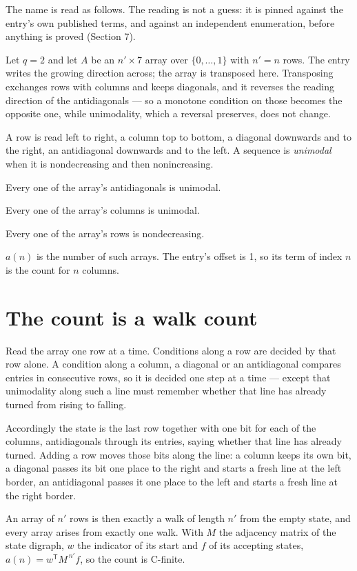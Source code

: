 \documentclass[11pt]{article}
\theoremstyle{definition}
\begin{document}
The name is read as follows. The reading is not a guess: it is pinned against the entry's own published terms, and against an independent enumeration, before anything is proved (Section 7).

Let $q = 2$ and let $A$ be an $n' \times 7$ array over $\{0,\dots,1\}$ with $n' = n$ rows. The entry writes the growing direction across; the array is transposed here. Transposing exchanges rows with columns and keeps diagonals, and it reverses the reading direction of the antidiagonals --- so a monotone condition on those becomes the opposite one, while unimodality, which a reversal preserves, does not change.

A row is read left to right, a column top to bottom, a diagonal downwards and to the right, an antidiagonal downwards and to the left. A sequence is {\itshape unimodal} when it is nondecreasing and then nonincreasing.

Every one of the array's antidiagonals is unimodal.

Every one of the array's columns is unimodal.

Every one of the array's rows is nondecreasing.

$a(n)$ is the number of such arrays. The entry's offset is 1, so its term of index $n$ is the count for $n$ columns.

\section{The count is a walk count}

Read the array one row at a time. Conditions along a row are decided by that row alone. A condition along a column, a diagonal or an antidiagonal compares entries in consecutive rows, so it is decided one step at a time --- except that unimodality along such a line must remember whether that line has already turned from rising to falling.

Accordingly the state is the last row together with one bit for each of the columns, antidiagonals through its entries, saying whether that line has already turned. Adding a row moves those bits along the line: a column keeps its own bit, a diagonal passes its bit one place to the right and starts a fresh line at the left border, an antidiagonal passes it one place to the left and starts a fresh line at the right border.

An array of $n'$ rows is then exactly a walk of length $n'$ from the empty state, and every array arises from exactly one walk. With $M$ the adjacency matrix of the state digraph, $w$ the indicator of its start and $f$ of its accepting states, $a(n) = w^{\mathsf T}M^{\,n'}f$, so the count is C-finite.
\end{document}
